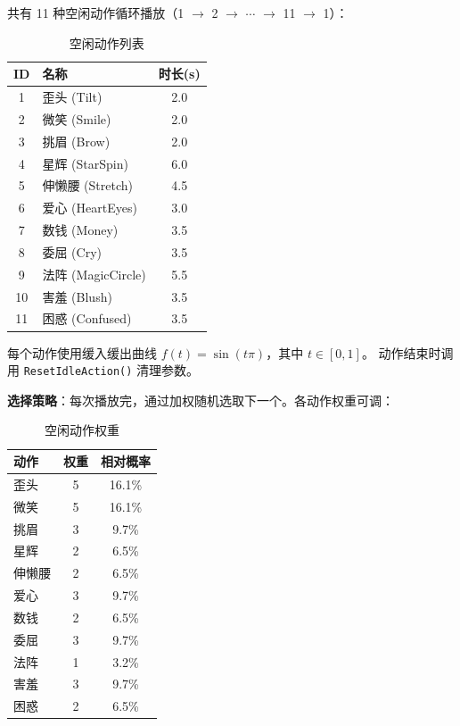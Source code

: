 \documentclass[12pt,a4paper]{ctexart}
\begin{document}
共有 11 种空闲动作循环播放（1 $\to$ 2 $\to$ $\cdots$ $\to$ 11 $\to$ 1）：

\begin{table}[H]
\centering
\caption{空闲动作列表}
\label{tab:idle}
\begin{tabular}{clc}
\toprule
\textbf{ID} & \textbf{名称} & \textbf{时长(s)} \\
\midrule
1 & 歪头 (Tilt)    & 2.0 \\
2 & 微笑 (Smile)   & 2.0 \\
3 & 挑眉 (Brow)    & 2.0 \\
4 & 星辉 (StarSpin) & 6.0 \\
5 & 伸懒腰 (Stretch) & 4.5 \\
6 & 爱心 (HeartEyes) & 3.0 \\
7 & 数钱 (Money)   & 3.5 \\
8 & 委屈 (Cry)     & 3.5 \\
9 & 法阵 (MagicCircle) & 5.5 \\
10 & 害羞 (Blush)  & 3.5 \\
11 & 困惑 (Confused) & 3.5 \\
\bottomrule
\end{tabular}
\end{table}

每个动作使用缓入缓出曲线 $f(t)=\sin(t\pi)$，其中 $t\in[0,1]$。
动作结束时调用 \texttt{ResetIdleAction()} 清理参数。

\textbf{选择策略}：每次播放完，通过加权随机选取下一个。各动作权重可调：

\begin{table}[H]
\centering
\caption{空闲动作权重}
\label{tab:idle-weights}
\begin{tabular}{lcc}
\toprule
\textbf{动作} & \textbf{权重} & \textbf{相对概率} \\
\midrule
歪头   & 5 & 16.1\% \\
微笑   & 5 & 16.1\% \\
挑眉   & 3 & 9.7\% \\
星辉   & 2 & 6.5\% \\
伸懒腰 & 2 & 6.5\% \\
爱心   & 3 & 9.7\% \\
数钱   & 2 & 6.5\% \\
委屈   & 3 & 9.7\% \\
法阵   & 1 & 3.2\% \\
害羞   & 3 & 9.7\% \\
困惑   & 2 & 6.5\% \\
\bottomrule
\end{tabular}
\end{table}
\end{document}
